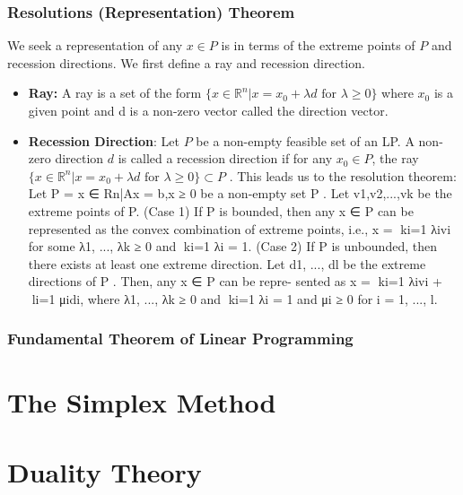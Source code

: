 \documentclass[11pt]{article}
\newcommand{\R}{\mathbb{R}}
\begin{document}
\subsubsection{Resolutions (Representation) Theorem}
We seek a representation of any $x \in P$ is  in terms of the extreme points of $P$ and recession directions. We first define a ray and recession direction. 
\begin{itemize}
\item \textbf{Ray:} A ray is a set of the form $\{ x \in \R^n|x=x_0 +\lambda d \text{ for } \lambda \geq 0 \}$ where $x_0$ is a given point and d is a non-zero vector called the direction vector.
\item \textbf{Recession Direction}: Let $P$ be a non-empty feasible set of an LP. A non-zero direction $d$ is called a recession direction if for any $x_0 \in P$, the ray $\{x \in \R^n|x = x_0 +\lambda d \text{ for } \lambda \geq 0 \} \subset P$ .
This leads us to the resolution theorem: 
Let P = {x ∈ Rn|Ax = b,x ≥ 0} be a non-empty set P . Let v1,v2,...,vk be the extreme points of P.
(Case 1) If P is bounded, then any x ∈ P can be represented as the convex combination of extreme points, i.e., x = 􏰺ki=1 λivi for some λ1, ..., λk ≥ 0 and 􏰺ki=1 λi = 1.
(Case 2) If P is unbounded, then there exists at least one extreme direction. Let d1, ..., dl be the extreme directions of P . Then, any x ∈ P can be repre- sented as x = 􏰺ki=1 λivi + 􏰺li=1 μidi, where λ1, ..., λk ≥ 0 and 􏰺ki=1 λi = 1 and μi ≥ 0 for i = 1, ..., l.
\end{itemize}
\subsubsection{Fundamental Theorem of Linear Programming}
\pagebreak
\section{The Simplex Method}
\section{Duality Theory}
\end{document}
